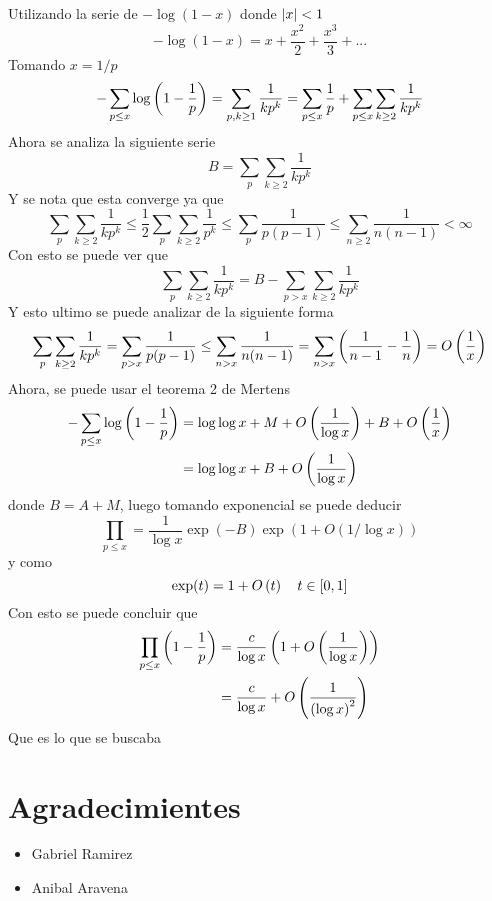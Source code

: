 \begin{sol}
	Utilizando la serie de $-\log (1-x)$ donde $\left|x\right|<1$
	\[-\log (1-x)=x+\frac{x^2}2+\frac{x^3}3+...\]
	Tomando $x=1/p$
	\[-\sum_{p\leq x}\log\left(1-\frac1p\right)=\sum_{p,k\geq1}\frac1{kp^k}=\sum_{p\leq x}\frac1p+\sum_{p\leq x}\sum_{k\geq2}\frac1{kp^k}\]
	Ahora se analiza la siguiente serie
	\[B=\sum_p\sum_{k\geq2}\frac1{kp^k}\]
	Y se nota que esta converge ya que
	\[\sum_p\sum_{k\geq2}\frac1{kp^k}\leq\frac12\sum_p\sum_{k\geq2}\frac1{p^k}\leq\sum_p\frac1{p(p-1)}\leq\sum_{n\geq2}\frac1{n(n-1)}<\infty\]
	Con esto se puede ver que
	\[\sum_p\sum_{k\geq2}\frac1{kp^k}=B-\sum_{p>x}\sum_{k\geq2}\frac1{kp^k}\]
	Y esto ultimo se puede analizar de la siguiente forma
	\[\sum_p\sum_{k\geq2}\frac1{kp^k}=\sum_{p>x}\frac1{p(p-1)}\leq\sum_{n>x}\frac1{n(n-1)}=\sum_{n>x}\left(\frac1{n-1}-\frac1n\right)=O\left(\frac1x\right)\]
	Ahora, se puede usar el teorema 2 de Mertens
	\begin{align*}
		-\sum_{p\leq x}\log\left(1-\frac1p\right)&=\log\log x+M+O\left(\frac1{\log x}\right)+B+O\left(\frac1x\right)\\
		&=\log\log x+B+O\left(\frac1{\log x}\right)
	\end{align*}
	donde $B=A+M$, luego tomando exponencial se puede deducir
	\[\prod_{p\leq x}=\frac1{\log x}\exp(-B)\exp(1+O(1/\log x))\]
	y como
	\[\exp(t)=1+O\left(t\right)\quad t\in[0,1]\]
	Con esto se puede concluir que
	\begin{align*}
		\prod_{p\leq x}\left(1-\frac1p\right)&=\frac{c}{\log x}\left(1+O\left(\frac1{\log x}\right)\right)\\
		&=\frac{c}{\log x}+O\left(\frac1{\left(\log x\right)^2}\right)
	\end{align*}
	Que es lo que se buscaba\cite{mertens3}
\end{sol}

\section{Agradecimientes}
\begin{multicols}{2}
	\begin{itemize}
		\item Gabriel Ramirez

		\item Anibal Aravena
	\end{itemize}
\end{multicols}




